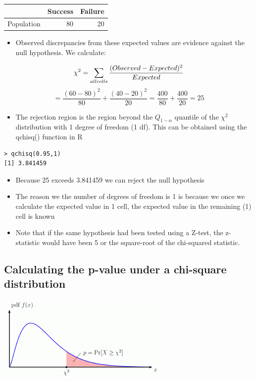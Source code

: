 \documentclass[
]{book}
\providecommand{\tightlist}{%
  \setlength{\itemsep}{0pt}\setlength{\parskip}{0pt}}
\begin{document}
\begin{tabular}{l|r|r}
\hline
  &  Success &  Failure\\
\hline
Population & 80 & 20\\
\hline
\end{tabular}

\begin{itemize}
\tightlist
\item
  Observed discrepancies from these expected values are evidence against the null hypothesis. We calculate:
\end{itemize}

\[\chi^2=\sum_{all\space cells}\frac{(Observed-Expected)^2}{Expected}\]
\[=\frac{(60-80)^2}{80}+\frac{(40-20)^2}{20}=\frac{400}{80}+\frac{400}{20}=25\]

\begin{itemize}
\tightlist
\item
  The rejection region is the region beyond the \(Q_{1-α}\) quantile of the \(\chi^2\) distribution with 1 degree of freedom (1 df). This can be obtained using the qchisq() function in R
\end{itemize}

\begin{verbatim}
> qchisq(0.95,1)
[1] 3.841459
\end{verbatim}

\begin{itemize}
\tightlist
\item
  Because 25 exceeds 3.841459 we can reject the null hypothesis
\item
  The reason we the number of degrees of freedom is 1 is because we once we calculate the expected value in 1 cell, the expected value in the remaining (1) cell is known
\item
  Note that if the same hypothesis had been tested using a Z-test, the z-statistic would have been 5 or the square-root of the chi-squared statistic.
\end{itemize}

\hypertarget{calculating-the-p-value-under-a-chi-square-distribution}{%
\subsection{Calculating the p-value under a chi-square distribution}\label{calculating-the-p-value-under-a-chi-square-distribution}}

\includegraphics[width=0.5\linewidth]{./8_36}
\end{document}
